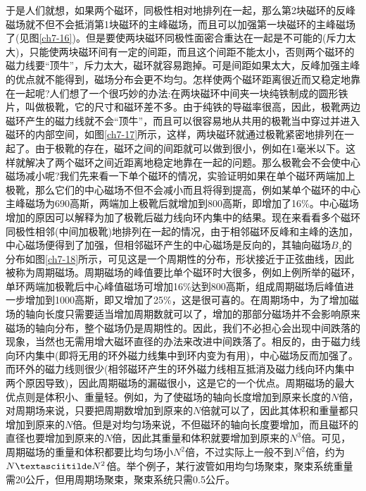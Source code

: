 于是人们就想，如果两个磁环，同极性相对地排列在一起，那么第2块磁环的反峰磁场就不但不会抵消第1块磁环的主峰磁场，而且可以加强第一块磁环的主峰磁场了(见图\ref{ch7-16})。但是要使两块磁环同极性面密合重达在一起是不可能的(斥力太大)，只能使两块磁环间有一定的间距，而且这个间距不能太小，否则两个磁环的磁力线要“顶牛”，斥力太大，磁环就容易跑掉。可是间距如果太大，反峰加强主峰的优点就不能得到，磁场分布会更不均匀。怎样使两个磁环距离很近而又稳定地靠在一起呢?人们想了一个很巧妙的办法:在两块磁环中间夹一块纯铁制成的圆形铁片，叫做极靴，它的尺寸和磁环差不多。由于纯铁的导磁率很高，因此，极靴两边磁环产生的磁力线就不会“顶牛”，而且可以很容易地从共用的极靴当中穿过并进入磁环的内部空间，如图\ref{ch7-17}所示，这样，两块磁环就通过极靴紧密地排列在一起了。由于极靴的存在，磁环之间的间距就可以做到很小，例如在1毫米以下。这样就解决了两个磁环之间近距离地稳定地靠在一起的问题。那么极靴会不会使中心磁场减小呢?我们先来看一下单个磁环的情况，实验证明如果在单个磁环两端加上极靴，那么它们的中心磁场不但不会减小而且将得到提高，例如某单个磁环的中心主峰磁场为690高斯，两端加上极靴后就增加到800高斯，即增加了16\%。中心磁场增加的原因可以解释为加了极靴后磁力线向环内集中的结果。现在来看看多个磁环同极性相邻(中间加极靴)地排列在一起的情况，由于相邻磁环反峰和主峰的迭加，中心磁场便得到了加强，但相邻磁环产生的中心磁场是反向的，其轴向磁场$ B_z $的分布如图\ref{ch7-18}所示，可见这是一个周期性的分布，形状接近于正弦曲线，因此被称为周期磁场。周期磁场的峰值要比单个磁环时大很多，例如上例所举的磁环，单环两端加极靴后中心峰值磁场可增加16\%达到800高斯，组成周期磁场后峰值进一步增加到1000高斯，即又增加了25\%，这是很可喜的。在周期场中，为了增加磁场的轴向长度只需要适当增加周期数就可以了，增加的那部分磁场并不会影响原来磁场的轴向分布，整个磁场仍是周期性的。因此，我们不必担心会出现中间跌落的现象，当然也无需用增大磁环直径的办法来改进中间跌落了。相反的，由于磁力线向环内集中(即将无用的环外磁力线集中到环内变为有用)，中心磁场反而加强了。而环外的磁力线则很少(相邻磁环产生的环外磁力线相互抵消及磁力线向环内集中两个原因导致)，因此周期磁场的漏磁很小，这是它的一个优点。周期磁场的最大优点则是体积小、重量轻。例如，为了使磁场的轴向长度增加到原来长度的$ N $倍，对周期场来说，只要把周期数增加到原来的$ N $倍就可以了，因此其体积和重量都只增加到原来的$ N $倍。但是对均匀场来说，不但磁环的轴向长度要增加，而且磁环的直径也要增加到原来的$ N $倍，因此其重量和体积就要增加到原来的$ N^3 $倍。可见，周期磁场的重量和体积都要比均匀场小$ N^2 $倍，不过实际上一般不到$ N^2 $倍，约为$ N\textasciitilde N^2 $倍。举个例子，某行波管如用均匀场聚束，聚束系统重量需20公斤，但用周期场聚束，聚束系统只需0.5公斤。
